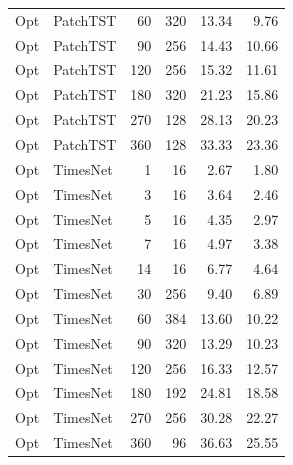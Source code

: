 {\begin{longtable}{llrrrr}
Opt & PatchTST & 60 & 320 & 13.34 & 9.76 \\
Opt & PatchTST & 90 & 256 & 14.43 & 10.66 \\
Opt & PatchTST & 120 & 256 & 15.32 & 11.61 \\
Opt & PatchTST & 180 & 320 & 21.23 & 15.86 \\
Opt & PatchTST & 270 & 128 & 28.13 & 20.23 \\
Opt & PatchTST & 360 & 128 & 33.33 & 23.36 \\
Opt & TimesNet & 1 & 16 & 2.67 & 1.80 \\
Opt & TimesNet & 3 & 16 & 3.64 & 2.46 \\
Opt & TimesNet & 5 & 16 & 4.35 & 2.97 \\
Opt & TimesNet & 7 & 16 & 4.97 & 3.38 \\
Opt & TimesNet & 14 & 16 & 6.77 & 4.64 \\
Opt & TimesNet & 30 & 256 & 9.40 & 6.89 \\
Opt & TimesNet & 60 & 384 & 13.60 & 10.22 \\
Opt & TimesNet & 90 & 320 & 13.29 & 10.23 \\
Opt & TimesNet & 120 & 256 & 16.33 & 12.57 \\
Opt & TimesNet & 180 & 192 & 24.81 & 18.58 \\
Opt & TimesNet & 270 & 256 & 30.28 & 22.27 \\
Opt & TimesNet & 360 & 96 & 36.63 & 25.55 \\
\end{longtable}
}

